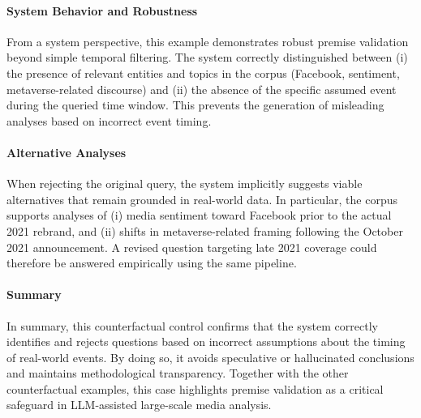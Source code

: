 \paragraph{System Behavior and Robustness}

From a system perspective, this example demonstrates robust premise validation beyond simple temporal filtering. The system correctly distinguished between (i) the presence of relevant entities and topics in the corpus (Facebook, sentiment, metaverse-related discourse) and (ii) the absence of the specific assumed event during the queried time window. This prevents the generation of misleading analyses based on incorrect event timing.

\paragraph{Alternative Analyses}

When rejecting the original query, the system implicitly suggests viable alternatives that remain grounded in real-world data. In particular, the corpus supports analyses of (i) media sentiment toward Facebook prior to the actual 2021 rebrand, and (ii) shifts in metaverse-related framing following the October 2021 announcement. A revised question targeting late 2021 coverage could therefore be answered empirically using the same pipeline.

\paragraph{Summary}

In summary, this counterfactual control confirms that the system correctly identifies and rejects questions based on incorrect assumptions about the timing of real-world events. By doing so, it avoids speculative or hallucinated conclusions and maintains methodological transparency. Together with the other counterfactual examples, this case highlights premise validation as a critical safeguard in LLM-assisted large-scale media analysis.


